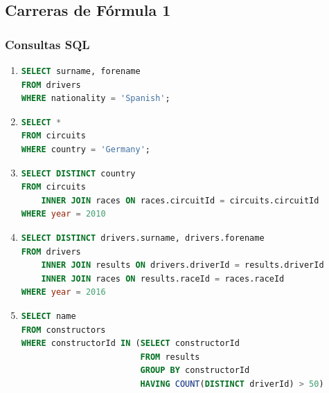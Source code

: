 \documentclass{db-practice}
\begin{document}
\subsection*{Carreras de Fórmula 1}

\subsubsection*{Consultas SQL}

\begin{enumerate}

\item 
\begin{lstlisting}[language=SQL]
SELECT surname, forename
FROM drivers 
WHERE nationality = 'Spanish';
\end{lstlisting}

\item 
\begin{lstlisting}[language=SQL]
SELECT *
FROM circuits 
WHERE country = 'Germany';
\end{lstlisting}

\item
\begin{lstlisting}[language=SQL]
SELECT DISTINCT country
FROM circuits
    INNER JOIN races ON races.circuitId = circuits.circuitId
WHERE year = 2010
\end{lstlisting}

\item
\begin{lstlisting}[language=SQL]
SELECT DISTINCT drivers.surname, drivers.forename
FROM drivers 
    INNER JOIN results ON drivers.driverId = results.driverId
    INNER JOIN races ON results.raceId = races.raceId
WHERE year = 2016
\end{lstlisting}

\item
\begin{lstlisting}[language=SQL]
SELECT name
FROM constructors
WHERE constructorId IN (SELECT constructorId
                        FROM results
                        GROUP BY constructorId
                        HAVING COUNT(DISTINCT driverId) > 50)
\end{lstlisting}


\end{enumerate}
\end{document}

